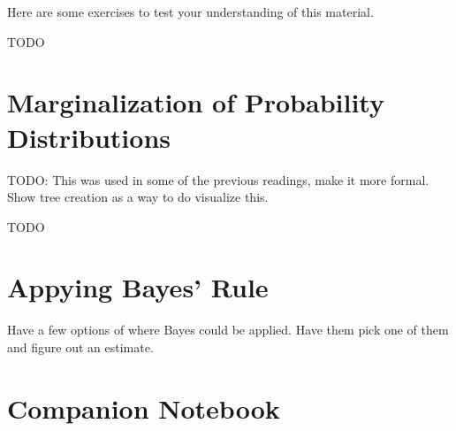 \documentclass[assignment01_Solutions]{subfiles}
\begin{document}
\begin{exercise}
Here are some exercises to test your understanding of this material.
\bes
\item TODO
\ees

\end{exercise}

\section{Marginalization of Probability Distributions}
TODO: This was used in some of the previous readings, make it more formal.   Show tree creation as a way to do visualize this.

\begin{exercise}
TODO
\end{exercise}

\section{Appying Bayes' Rule}

Have a few options of where Bayes could be applied.  Have them pick one of them and figure out an estimate.

\section{Companion Notebook}
\end{document}

